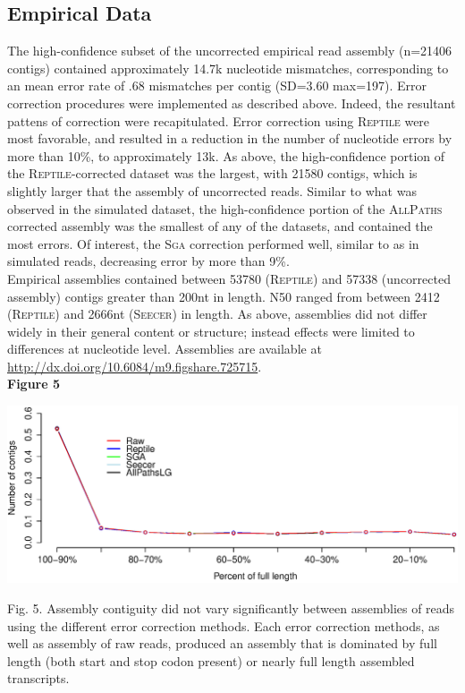 \documentclass[11pt]{article}
\begin{document}
\subsection*{Empirical Data} 
The high-confidence subset of the uncorrected empirical read assembly (n=21406 contigs) contained approximately 14.7k nucleotide mismatches, corresponding to an mean error rate of .68 mismatches per contig (SD=3.60 max=197).  Error correction procedures were implemented as described above. Indeed, the resultant pattens of correction were recapitulated. Error correction using \textsc{Reptile} were most favorable, and resulted in a reduction in the number of nucleotide errors by more than 10\%, to approximately 13k.  As above, the high-confidence portion of the \textsc{Reptile}-corrected dataset was the largest, with 21580 contigs, which is slightly larger that the assembly of uncorrected reads. Similar to what was observed in the simulated dataset, the high-confidence portion of the \textsc{AllPaths} corrected assembly was the smallest of any of the datasets, and contained the most errors. Of interest, the \textsc{Sga} correction performed well, similar to as in simulated reads, decreasing error by more than 9\%. \\

\noindent
Empirical assemblies contained between 53780 (\textsc{Reptile}) and 57338 (uncorrected assembly) contigs greater than 200nt in length.  N50 ranged from between 2412 (\textsc{Reptile}) and 2666nt (\textsc{Seecer}) in length.  As above, assemblies did not differ widely in their general content or structure; instead effects were limited to differences at nucleotide level. Assemblies are available at \url{http://dx.doi.org/10.6084/m9.figshare.725715}. \\

\textbf{\hypertarget{Figure 5}{Figure 5}} \\
\centerline{\includegraphics[width=20.0\baselineskip]{newFig4.eps}}

\noindent
\begin{changemargin}{2cm}{2cm}
Fig. 5. Assembly contiguity did not vary significantly between assemblies of reads using the different error correction methods. Each error correction methods, as well as assembly of raw reads, produced an assembly that is dominated by full length (both start and stop codon present) or nearly full length assembled transcripts. 
\end{changemargin}
\vspace{10mm}
\end{document}
